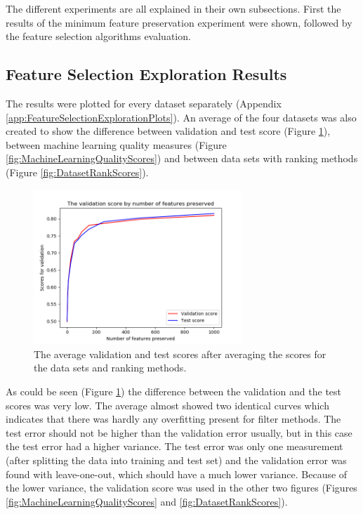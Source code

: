 \documentclass[10pt,a4paper]{article}
\begin{document}
	The different experiments are all explained in their own subsections. First the results of the minimum feature preservation experiment were shown, followed by the feature selection algorithms evaluation.
	
	\subsection{Feature Selection Exploration Results}
	\label{subsec:FeatureReductionExplorationResults}
	
	The results were plotted for every dataset separately (Appendix \ref{app:FeatureSelectionExplorationPlots}). An average of the four datasets was also created to show the difference between validation and test score (Figure \ref{fig:ValTestScores}), between machine learning quality measures (Figure \ref{fig:MachineLearningQualityScores}) and between data sets with ranking methods (Figure \ref{fig:DatasetRankScores}).
	
	\begin{figure}[H]
		\includegraphics[width=0.7\textwidth]{Val_Test_Scores.png}
		\caption{The average validation and test scores after averaging the scores for the data sets and ranking methods.}
		\label{fig:ValTestScores}
	\end{figure}
	
	As could be seen (Figure \ref{fig:ValTestScores}) the difference between the validation and the test scores was very low. The average almost showed two identical curves which indicates that there was hardly any overfitting present for filter methods. The test error should not be higher than the validation error usually, but in this case the test error had a higher variance. The test error was only one measurement (after splitting the data into training and test set) and the validation error was found with leave-one-out, which should have a much lower variance. Because of the lower variance, the validation score was used in the other two figures (Figures \ref{fig:MachineLearningQualityScores} and \ref{fig:DatasetRankScores}).
	
\end{document}
